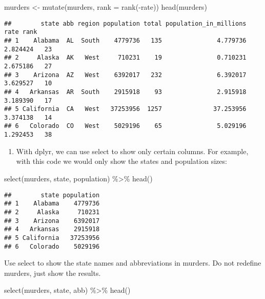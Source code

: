 \documentclass[
]{article}
\newenvironment{Shaded}{\begin{snugshade}}{\end{snugshade}}
\newcommand{\AttributeTok}[1]{\textcolor[rgb]{0.77,0.63,0.00}{#1}}
\newcommand{\FunctionTok}[1]{\textcolor[rgb]{0.00,0.00,0.00}{#1}}
\newcommand{\NormalTok}[1]{#1}
\newcommand{\OtherTok}[1]{\textcolor[rgb]{0.56,0.35,0.01}{#1}}
\newcommand{\SpecialCharTok}[1]{\textcolor[rgb]{0.00,0.00,0.00}{#1}}
\providecommand{\tightlist}{%
  \setlength{\itemsep}{0pt}\setlength{\parskip}{0pt}}
\begin{document}
\begin{Shaded}
\begin{Highlighting}[]
\NormalTok{murders }\OtherTok{\textless{}{-}} \FunctionTok{mutate}\NormalTok{(murders, }\AttributeTok{rank =} \FunctionTok{rank}\NormalTok{(}\SpecialCharTok{{-}}\NormalTok{rate))}
\FunctionTok{head}\NormalTok{(murders)}
\end{Highlighting}
\end{Shaded}

\begin{verbatim}
##        state abb region population total population_in_millions     rate rank
## 1    Alabama  AL  South    4779736   135               4.779736 2.824424   23
## 2     Alaska  AK   West     710231    19               0.710231 2.675186   27
## 3    Arizona  AZ   West    6392017   232               6.392017 3.629527   10
## 4   Arkansas  AR  South    2915918    93               2.915918 3.189390   17
## 5 California  CA   West   37253956  1257              37.253956 3.374138   14
## 6   Colorado  CO   West    5029196    65               5.029196 1.292453   38
\end{verbatim}

\begin{enumerate}
\def\labelenumi{\arabic{enumi}.}
\setcounter{enumi}{2}
\tightlist
\item
  With dplyr, we can use select to show only certain columns. For
  example, with this code we would only show the states and population
  sizes:
\end{enumerate}

\begin{Shaded}
\begin{Highlighting}[]
\FunctionTok{select}\NormalTok{(murders, state, population) }\SpecialCharTok{\%\textgreater{}\%} \FunctionTok{head}\NormalTok{()}
\end{Highlighting}
\end{Shaded}

\begin{verbatim}
##        state population
## 1    Alabama    4779736
## 2     Alaska     710231
## 3    Arizona    6392017
## 4   Arkansas    2915918
## 5 California   37253956
## 6   Colorado    5029196
\end{verbatim}

Use select to show the state names and abbreviations in murders. Do not
redefine murders, just show the results.

\begin{Shaded}
\begin{Highlighting}[]
\FunctionTok{select}\NormalTok{(murders, state, abb) }\SpecialCharTok{\%\textgreater{}\%} \FunctionTok{head}\NormalTok{()}
\end{Highlighting}
\end{Shaded}
\end{document}
